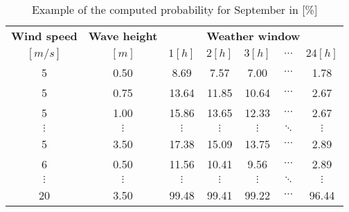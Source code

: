 \begin{table}
\label{tab:proba}
\begin{tabular}{ccccccc}
\hline
{\bf Wind speed} & {\bf Wave height} & \multicolumn{ 5}{c}{{\bf Weather window}} \\
$[m/s]$      &      $[m]$      &          $1 [h]$ &          $2 [h]$ &          $3 [h]$ &  $\cdots$ &         $24 [h]$ \\
\hline
5 &       0.50 &       8.69 &       7.57 &       7.00 &  $\cdots$ &       1.78 \\
5 &       0.75 &      13.64 &      11.85 &      10.64 &  $\cdots$ &       2.67 \\
5 &       1.00 &      15.86 &      13.65 &      12.33 &  $\cdots$ &       2.67 \\
 $\vdots$ &  $\vdots$ &  $\vdots$ &  $\vdots$ &  $\vdots$ &  $\ddots$ &  $\vdots$ \\
5 &       3.50 &      17.38 &      15.09 &      13.75 &  $\cdots$ &       2.89 \\
6 &       0.50 &      11.56 &      10.41 &       9.56 &  $\cdots$ &       2.89 \\
 $\vdots$ &  $\vdots$ &  $\vdots$ &  $\vdots$ &  $\vdots$ & $\ddots$           &  $\vdots$ \\
20 &       3.50 &      99.48 &      99.41 &      99.22 &  $\cdots$ &      96.44 \\
\hline
\end{tabular}  

\caption{Example of the computed probability for September in [\%]}
\end{table}